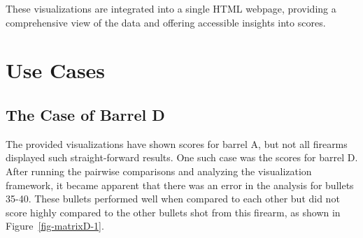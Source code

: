 \documentclass[
  12pt]{article}
\begin{document}
These visualizations are integrated into a single HTML webpage,
providing a comprehensive view of the data and offering accessible
insights into scores.

\section{Use Cases}\label{use-cases}

\subsection{The Case of Barrel D}\label{the-case-of-barrel-d}

The provided visualizations have shown scores for barrel A, but not all
firearms displayed such straight-forward results. One such case was the
scores for barrel D. After running the pairwise comparisons and
analyzing the visualization framework, it became apparent that there was
an error in the analysis for bullets 35-40. These bullets performed well
when compared to each other but did not score highly compared to the
other bullets shot from this firearm, as shown in
Figure~\ref{fig-matrixD-1}.
\end{document}
